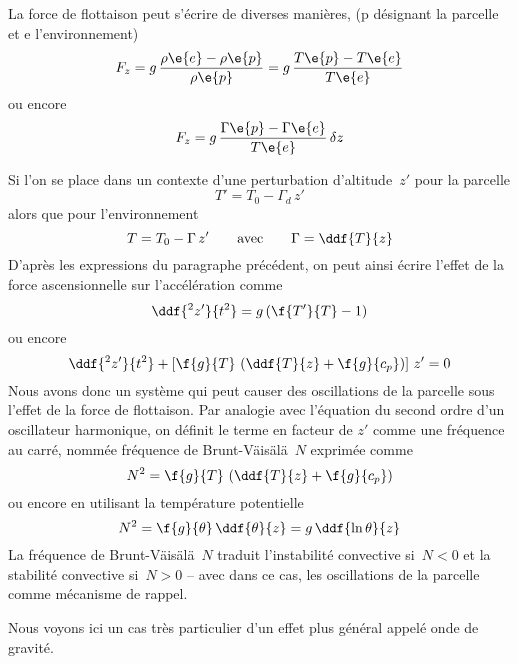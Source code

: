 \sk
La force de flottaison peut s'écrire de diverses manières,
(p désignant la parcelle et e l'environnement)
\[ F_z = g \, \frac{\rho\e{e}-\rho\e{p}}{\rho\e{p}} = g \, \frac{T\e{p}-T\e{e}}{T\e{e}}  \]
\noindent ou encore
\[ F_z = g \, \frac{\Gamma\e{p}-\Gamma\e{e}}{T\e{e}} \, \delta z \]

\sk
Si l'on se place dans un contexte d'une perturbation d'altitude~$z'$
pour la parcelle
\[ T' = T_0 - \Gamma_d \, z' \]
alors que pour l'environnement
\[ T = T_0 - \Gamma \, z' \qquad \textrm{avec} \qquad \Gamma = \ddf{T}{z} \]
\noindent D'après les expressions du paragraphe précédent,
on peut ainsi écrire l'effet de la force ascensionnelle
sur l'accélération comme
\[ \ddf{^2 z'}{t^2} = g \left( \f{T'}{T} - 1 \right) \]
\noindent ou encore
\[ 
\ddf{^2 z'}{t^2} + \left[ \f{g}{T} \, \left( \ddf{T}{z} + \f{g}{c_p} \right)  \right] \, z' = 0
\]
\noindent Nous avons donc un système qui
peut causer des oscillations de la parcelle sous l'effet de la force de flottaison.
Par analogie avec l'équation du second ordre d'un
oscillateur harmonique, on définit le terme en
facteur de $z'$ comme une fréquence au carré, 
nommée fréquence de Brunt-V{\"a}is{\"a}l{\"a}~$N$
exprimée comme
\[ N^2 = \f{g}{T} \, \left( \ddf{T}{z} + \f{g}{c_p} \right) \]
\noindent ou encore en utilisant la température potentielle
\[ N^2 = \f{g}{\theta} \, \ddf{\theta}{z} = g \, \ddf{\ln\theta}{z} \]
\noindent La fréquence de Brunt-V{\"a}is{\"a}l{\"a}~$N$
traduit l'instabilité convective si~$N<0$
et la stabilité convective si~$N>0$ -- avec dans ce cas,
les oscillations de la parcelle comme mécanisme de rappel.

\sk
Nous voyons ici un cas très particulier d'un effet plus général appelé onde de gravité.
